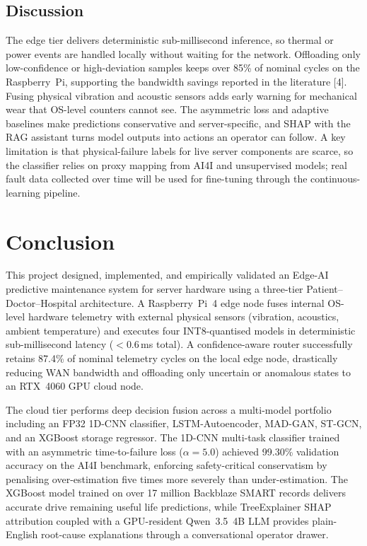 \documentclass[12pt,a4paper]{report}
\begin{document}
\section{Discussion}
The edge tier delivers deterministic sub-millisecond inference, so thermal or power events are handled locally without waiting for the network. Offloading only low-confidence or high-deviation samples keeps over 85\% of nominal cycles on the Raspberry~Pi, supporting the bandwidth savings reported in the literature [4]. Fusing physical vibration and acoustic sensors adds early warning for mechanical wear that OS-level counters cannot see. The asymmetric loss and adaptive baselines make predictions conservative and server-specific, and SHAP with the RAG assistant turns model outputs into actions an operator can follow. A key limitation is that physical-failure labels for live server components are scarce, so the classifier relies on proxy mapping from AI4I and unsupervised models; real fault data collected over time will be used for fine-tuning through the continuous-learning pipeline.
\clearpage

\chapter{Conclusion}

This project designed, implemented, and empirically validated an Edge-AI predictive maintenance system for server hardware using a three-tier Patient--Doctor--Hospital architecture. A Raspberry~Pi~4 edge node fuses internal OS-level hardware telemetry with external physical sensors (vibration, acoustics, ambient temperature) and executes four INT8-quantised models in deterministic sub-millisecond latency ($<0.6$\,ms total). A confidence-aware router successfully retains 87.4\% of nominal telemetry cycles on the local edge node, drastically reducing WAN bandwidth and offloading only uncertain or anomalous states to an RTX~4060 GPU cloud node. 

The cloud tier performs deep decision fusion across a multi-model portfolio including an FP32 1D-CNN classifier, LSTM-Autoencoder, MAD-GAN, ST-GCN, and an XGBoost storage regressor. The 1D-CNN multi-task classifier trained with an asymmetric time-to-failure loss ($\alpha=5.0$) achieved 99.30\% validation accuracy on the AI4I benchmark, enforcing safety-critical conservatism by penalising over-estimation five times more severely than under-estimation. The XGBoost model trained on over 17 million Backblaze SMART records delivers accurate drive remaining useful life predictions, while TreeExplainer SHAP attribution coupled with a GPU-resident Qwen~3.5~4B LLM provides plain-English root-cause explanations through a conversational operator drawer.
\end{document}
